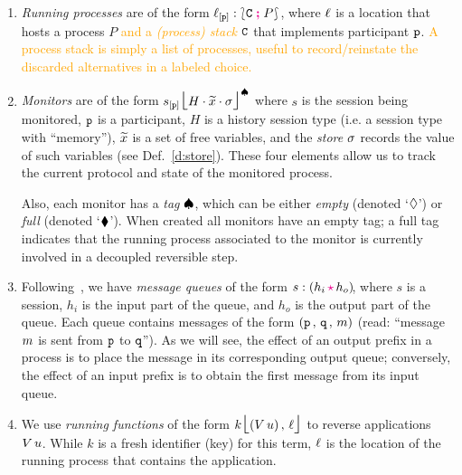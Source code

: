 \documentclass[runningheads]{llncs}
\newcommand{\erase}[1]{\textcolor{orange}{#1}}
\begin{document}
\begin{enumerate}[$\bullet$]
\item \emph{Running processes} are of the form $\ell_{[\mathtt{p}]}:\lbag \mathtt{C} \; \textcolor{magenta}{\textbf{;}}\; P \rbag$, where $\ell$ is a location that 
hosts a process $P$ \erase{ and a \emph{(process) stack} $\mathtt{C}$} that implements participant $\mathtt{p}$.
\erase{A process stack is simply a list of processes, useful 
  to record/reinstate the discarded alternatives   in a labeled choice.}

\item \emph{Monitors} are of the form ${s_{[\mathtt{p}]}\mbox{{\Large $\lfloor$}} \textcolor{black}{H}\cdot \widetilde{x}\cdot \sigma \mbox{{\Large $\rfloor$}}^{\spadesuit}}$ 
where 
$s$ is the session being monitored, 
$\mathtt{p}$ is a participant,
$H$ is a history session type (i.e. a session type with ``memory''), 
$\widetilde{x}$ is a set of free variables, 
and the \emph{store} $\sigma$  records the value of such variables (see Def.~\ref{d:store}).
These four elements allow us to track the current protocol
and  state of the   monitored process.

Also, each monitor has a 
\emph{tag} $\spadesuit$, which can be either \emph{empty} (denoted `$\lozenge$') or \emph{full} (denoted `$\blacklozenge$'). 
When created all monitors have an empty tag; a full tag indicates that the running process associated to the monitor
is currently involved in a  decoupled reversible step.


\item Following~\cite{DBLP:journals/mscs/KouzapasYHH16}, we have \emph{message queues}
of the form 
$\codah{s}{h_i}{h_o}$,
where $s$ is a session, $h_i$ is the input part of the queue, and $h_o$ is the output part of the queue.
Each queue contains messages of the form $(\mathtt{p} \,,\, \mathtt{q} \,,\,m)$ (read: ``message $m$ is sent from $\mathtt{p}$ to $\mathtt{q}$'').
As we will see, the effect of an output prefix in a process is to place the message in its corresponding output queue;
conversely, the effect of an input prefix is to obtain the first message from its input queue. 


\item We use \emph{running functions} of the form $k\mbox{{\Large $\lfloor$}} (V\, {u})\,,\, \ell \mbox{{\Large $\rfloor$}}$ to reverse
 applications $V\, {u}$. While $k$ is a fresh identifier (key) for this term, $\ell$ is the location of 
the running process that contains the application.

\end{enumerate}
\end{document}
